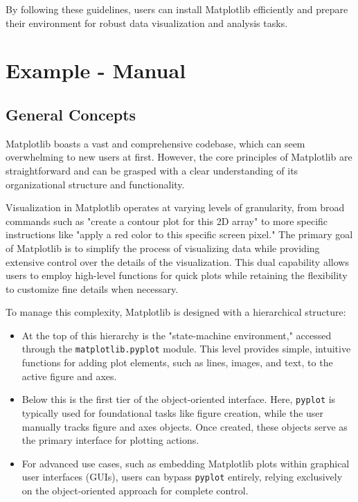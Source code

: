 By following these guidelines, users can install Matplotlib efficiently and prepare their environment for robust data visualization and analysis tasks.


\section{Example - Manual}

\subsection{General Concepts}

Matplotlib boasts a vast and comprehensive codebase, which can seem overwhelming to new users at first. However, the core principles of Matplotlib are straightforward and can be grasped with a clear understanding of its organizational structure and functionality.

Visualization in Matplotlib operates at varying levels of granularity, from broad commands such as "create a contour plot for this 2D array" to more specific instructions like "apply a red color to this specific screen pixel." The primary goal of Matplotlib is to simplify the process of visualizing data while providing extensive control over the details of the visualization. This dual capability allows users to employ high-level functions for quick plots while retaining the flexibility to customize fine details when necessary.

To manage this complexity, Matplotlib is designed with a hierarchical structure:
\begin{itemize}
	\item At the top of this hierarchy is the "state-machine environment," accessed through the \texttt{matplotlib.pyplot} module. This level provides simple, intuitive functions for adding plot elements, such as lines, images, and text, to the active figure and axes.
	\item Below this is the first tier of the object-oriented interface. Here, \texttt{pyplot} is typically used for foundational tasks like figure creation, while the user manually tracks figure and axes objects. Once created, these objects serve as the primary interface for plotting actions.
	\item For advanced use cases, such as embedding Matplotlib plots within graphical user interfaces (GUIs), users can bypass \texttt{pyplot} entirely, relying exclusively on the object-oriented approach for complete control.
\end{itemize}

